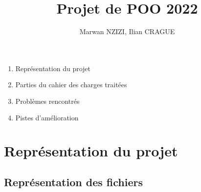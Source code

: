 \documentclass{article}
\title{Projet de POO 2022}
\author{Marwan NZIZI, Ilian CRAGUE }
\begin{document}
\maketitle

\begin{enumerate}
  \item Représentation du projet
  \item Parties du cahier des charges traitées
  \item Problèmes rencontrés
  \item Pistes d'amélioration
\end{enumerate}

\section{Représentation du projet}

\subsection{Représentation des fichiers}
\end{document}
